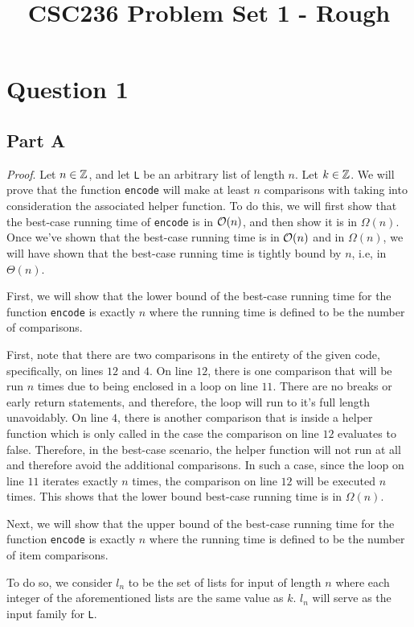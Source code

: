 \documentclass{article}
\title{ CSC236 Problem Set 1 - Rough }
\begin{document}
\section*{Question 1}
\subsection*{Part A}
\textit{Proof}. Let $n \in \mathbb Z$, and let \verb|L| be an arbitrary list of length $n$. Let $k \in \mathbb Z$. We will prove that the function \verb|encode| will make at least $n$ comparisons with taking into consideration the associated helper function. To do this, we will first show that the best-case running time of \verb|encode| is in $\mathcal O (n)$, and then show it is in $\Omega (n)$. Once we've shown that the best-case running time is in $\mathcal O (n)$ and in $\Omega (n)$, we will have shown that the best-case running time is tightly bound by $n$, i.e, in $\Theta (n)$.

\medskip

First, we will show that the lower bound of the best-case running time for the function \verb|encode| is exactly $n$ where the running time is defined to be the number of comparisons.

First, note that there are two comparisons in the entirety of the given code, specifically, on lines $12$ and $4$. On line $12$, there is one comparison that will be run $n$ times due to being enclosed in a loop on line $11$. There are no breaks or early return statements, and therefore, the loop will run to it's full length unavoidably. On line $4$, there is another comparison that is inside a helper function which is only called in the case the comparison on line $12$ evaluates to false. Therefore, in the best-case scenario, the helper function will not run at all and therefore avoid the additional comparisons. In such a case, since the loop on line $11$ iterates exactly $n$ times, the comparison on line $12$ will be executed $n$ times. This shows that the lower bound best-case running time is in $\Omega(n)$.

\medskip

Next, we will show that the upper bound of the best-case running time for the function \verb|encode| is exactly $n$ where the running time is defined to be the number of item comparisons.

To do so, we consider $l_n$ to be the set of lists for input of length $n$ where each integer of the aforementioned lists are the same value as $k$. $l_n$ will serve as the input family for \verb|L|.
\end{document}
